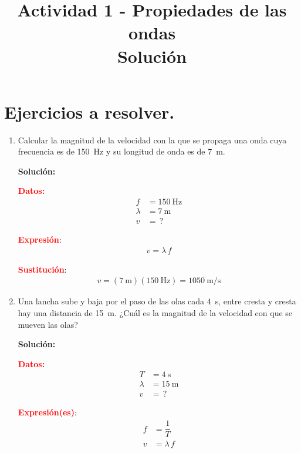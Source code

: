 \documentclass[14pt]{extarticle}
\title{\vspace*{-2cm} Actividad 1 - Propiedades de las ondas \\ \Large{Solución} \vspace{-5ex}}
\date{}
\newcommand{\textocolor}[2]{\textbf{\textcolor{#1}{#2}}}
\begin{document}
\maketitle

\section*{Ejercicios a resolver.}

\begin{enumerate}
\item Calcular la magnitud de la velocidad con la que se propaga una onda cuya frecuencia es de \SI{150}{\hertz} y su longitud de onda es de \SI{7}{\meter}.

\textbf{Solución:}

\begin{minipage}[t]{0.3\linewidth}
\noindent
\textocolor{red}{Datos:}
\begin{align*}
f &= \SI{150}{\hertz} \\
\lambda &= \SI{7}{\meter} \\
v &= \, ?
\end{align*}
\end{minipage}
\hspace{1cm}
\begin{minipage}[t]{0.3\linewidth}
\noindent
\textocolor{red}{Expresión}:
\begin{align*}
v = \lambda \, f
\end{align*}
\end{minipage}

\begin{minipage}{0.5\linewidth}
\noindent
\textocolor{red}{Sustitución}:
\begin{align*}
v = (\SI{7}{\meter})(\SI{150}{\hertz}) = \SI{1050}{\meter\per\second}
\end{align*}
\end{minipage}
\item Una lancha sube y baja por el paso de las olas cada \SI{4}{\second}, entre cresta y cresta hay una distancia de \SI{15}{\meter}. ¿Cuál es la magnitud de la velocidad con que se mueven las olas?

\textbf{Solución:}

\begin{minipage}[t]{0.3\linewidth}
\noindent
\textocolor{red}{Datos:}
\begin{align*}
T &= \SI{4}{\second} \\
\lambda &= \SI{15}{\meter} \\
v &= \, ?
\end{align*}
\end{minipage}
\hspace{1cm}
\begin{minipage}[t]{0.3\linewidth}
\noindent
\textocolor{red}{Expresión(es)}:
\begin{align*}
f &= \dfrac{1}{T} \\
v &= \lambda \, f
\end{align*}
\end{minipage}


\end{enumerate}
\end{document}
